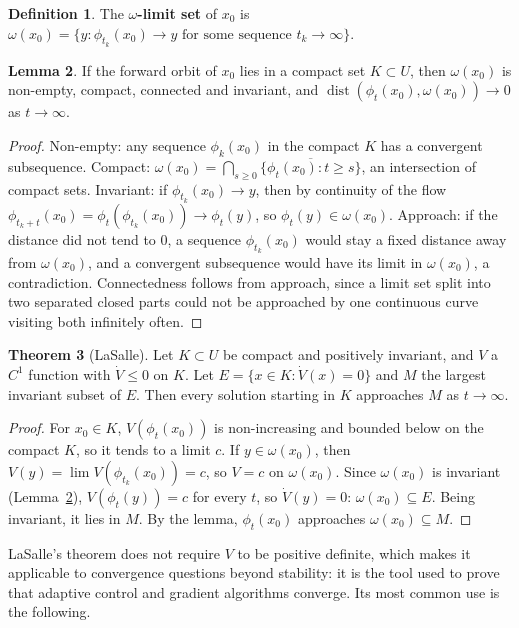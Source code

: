 \documentclass[11pt,a4paper]{article}
\numberwithin{equation}{section}
\theoremstyle{definition}
\newtheorem{thm}{Theorem}[subsection]
\newtheorem{defn}[thm]{Definition}
\newtheorem{lem}[thm]{Lemma}
\begin{document}
\begin{defn}
The \textbf{$\omega$-limit set} of $x_0$ is $\omega(x_0) = \{y : \phi_{t_k}(x_0) \to y \text{ for some sequence } t_k \to \infty\}$.
\end{defn}

\begin{lem}
\label{lem:omega}
If the forward orbit of $x_0$ lies in a compact set $K \subset U$, then $\omega(x_0)$ is non-empty, compact, connected and invariant, and $\operatorname{dist}(\phi_t(x_0), \omega(x_0)) \to 0$ as $t \to \infty$.
\end{lem}

\begin{proof}
Non-empty: any sequence $\phi_k(x_0)$ in the compact $K$ has a convergent subsequence. Compact: $\omega(x_0) = \bigcap_{s\geq0}\overline{\{\phi_t(x_0) : t \geq s\}}$, an intersection of compact sets. Invariant: if $\phi_{t_k}(x_0) \to y$, then
by continuity of the flow $\phi_{t_k + t}(x_0) = \phi_t(\phi_{t_k}(x_0)) \to \phi_t(y)$, so $\phi_t(y) \in \omega(x_0)$. Approach: if the distance did not tend to $0$, a sequence $\phi_{t_k}(x_0)$ would stay a fixed distance away from
$\omega(x_0)$, and a convergent subsequence would have its limit in $\omega(x_0)$, a contradiction. Connectedness follows from approach, since a limit set split into two separated closed parts
could not be approached by one continuous curve visiting both infinitely often.
\end{proof}

\begin{thm}[LaSalle]
\label{thm:lasalle}
Let $K \subset U$ be compact and positively invariant, and $V$ a $C^1$ function with $\dot V \leq 0$ on $K$. Let $E = \{x \in K : \dot V(x) = 0\}$ and $M$ the largest invariant subset of $E$. Then every solution
starting in $K$ approaches $M$ as $t \to \infty$.
\end{thm}

\begin{proof}
For $x_0 \in K$, $V(\phi_t(x_0))$ is non-increasing and bounded below on the compact $K$, so it tends to a limit $c$. If $y \in \omega(x_0)$, then $V(y) = \lim V(\phi_{t_k}(x_0)) = c$, so $V = c$ on $\omega(x_0)$. Since $\omega(x_0)$ is
invariant (Lemma~\ref{lem:omega}), $V(\phi_t(y)) = c$ for every $t$, so $\dot V(y) = 0$: $\omega(x_0) \subseteq E$. Being invariant, it lies in $M$. By the lemma, $\phi_t(x_0)$ approaches $\omega(x_0) \subseteq M$.
\end{proof}

LaSalle's theorem does not require $V$ to be positive definite, which makes it applicable to convergence questions beyond stability: it is the tool used to prove that adaptive control
and gradient algorithms converge. Its most common use is the following.
\end{document}
